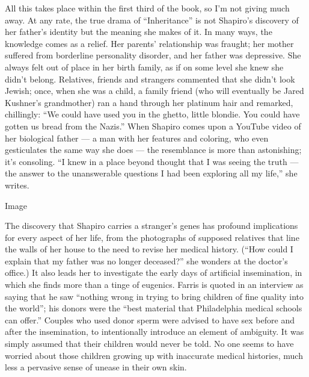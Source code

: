 All this takes place within the first third of the book, so I'm not
giving much away. At any rate, the true drama of ``Inheritance'' is not
Shapiro's discovery of her father's identity but the meaning she makes
of it. In many ways, the knowledge comes as a relief. Her parents'
relationship was fraught; her mother suffered from borderline
personality disorder, and her father was depressive. She always felt out
of place in her birth family, as if on some level she knew she didn't
belong. Relatives, friends and strangers commented that she didn't look
Jewish; once, when she was a child, a family friend (who will eventually
be Jared Kushner's grandmother) ran a hand through her platinum hair and
remarked, chillingly: ``We could have used you in the ghetto, little
blondie. You could have gotten us bread from the Nazis.'' When Shapiro
comes upon a YouTube video of her biological father --- a man with her
features and coloring, who even gesticulates the same way she does ---
the resemblance is more than astonishing; it's consoling. ``I knew in a
place beyond thought that I was seeing the truth --- the answer to the
unanswerable questions I had been exploring all my life,'' she writes.

Image

The discovery that Shapiro carries a stranger's genes has profound
implications for every aspect of her life, from the photographs of
supposed relatives that line the walls of her house to the need to
revise her medical history. (``How could I explain that my father was no
longer deceased?'' she wonders at the doctor's office.) It also leads
her to investigate the early days of artificial insemination, in which
she finds more than a tinge of eugenics. Farris is quoted in an
interview as saying that he saw ``nothing wrong in trying to bring
children of fine quality into the world''; his donors were the ``best
material that Philadelphia medical schools can offer.'' Couples who used
donor sperm were advised to have sex before and after the insemination,
to intentionally introduce an element of ambiguity. It was simply
assumed that their children would never be told. No one seems to have
worried about those children growing up with inaccurate medical
histories, much less a pervasive sense of unease in their own skin.

